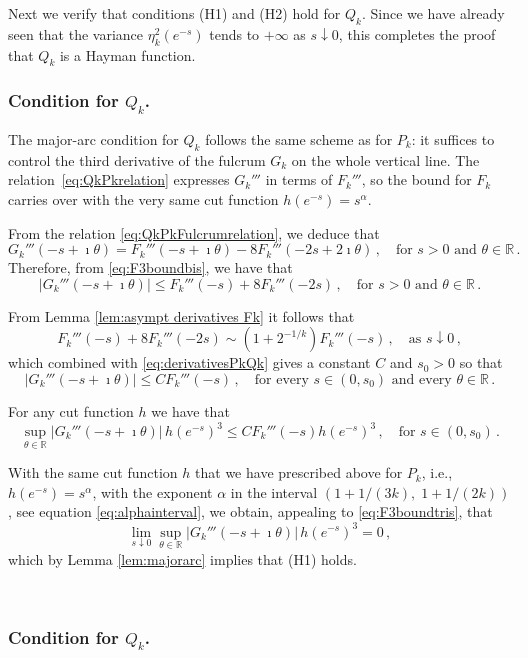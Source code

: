 \documentclass[12pt]{amsart}
\theoremstyle{definition}
\newcommand{\R}{\mathbb{R}}
\begin{document}
Next we verify that conditions (H1) and (H2) hold for $Q_k$. Since we have already seen that the variance $\eta^2_k(e^{-s})$ tends to $+\infty$ as $s \downarrow 0$, this completes the proof that $Q_k$ is a Hayman function.

\subsubsection{Condition {} for $Q_k$.}
The major-arc condition for \(Q_k\) follows the same scheme as for
\(P_k\): it suffices to control the third derivative of the fulcrum
\(G_k\) on the whole vertical line. The relation~\eqref{eq:QkPkrelation}
expresses \(G_k'''\) in terms of \(F_k'''\), so the bound for \(F_k\) carries over with the very same cut
function \(h(e^{-s})=s^\alpha\).
\smallskip

From the relation \eqref{eq:QkPkFulcrumrelation}, we deduce that
$$
G_k'''(-s+\imath \theta)=F_k'''(-s+\imath \theta)-8 F_k'''(-2s+2\imath  \theta)\, , \quad \mbox{for $s>0$ and $\theta \in \R$}\,.$$
Therefore, from \eqref{eq:F3boundbis}, we have that
$$|G_k'''(-s+\imath \theta)|\le F_k'''(-s)+8F_k'''(-2s)\, , \quad \mbox{for $s>0$ and $\theta \in \R$}\,.$$

\medskip
From Lemma \ref{lem:asympt derivatives Fk} it follows that
$$F_k'''(-s)+8F_k'''(-2s)\sim (1+2^{-1/k})F_k'''(-s)\, , \quad \mbox{as $s \downarrow 0$}\,,$$
which combined with \eqref{eq:derivativesPkQk} gives a constant $C$ and $s_0>0$ so that
$$
|G_k'''(-s+\imath \theta)|\le C F_k'''(-s)\, , \quad \mbox{for every $s \in (0, s_0)$ and every $\theta\in \R$}\,.$$

For any cut function $h$ we have that
$$
\sup_{\theta \in \R} |G_k'''(-s+\imath \theta)|\, h(e^{-s})^3\le C F_k'''(-s) h(e^{-s})^3\, , \quad \mbox{for $s \in (0, s_0)$}\,.$$

With the same cut function $h$ that we have prescribed above for $P_k$, i.e., $h(e^{-s})=s^\alpha$, with the exponent $\alpha$ in the interval  $(1+1/(3k),\; 1+1/(2k))$, see equation \eqref{eq:alphainterval}, we obtain, appealing to \eqref{eq:F3boundtris}, that
$$\lim_{s \downarrow 0} \sup_{\theta \in \R} |G_k'''(-s+\imath \theta)|\, h(e^{-s})^3=0\,,$$
which by Lemma \ref{lem:majorarc} implies that (H1) holds.

\


\subsubsection{Condition {} for $Q_k$.}
\end{document}
